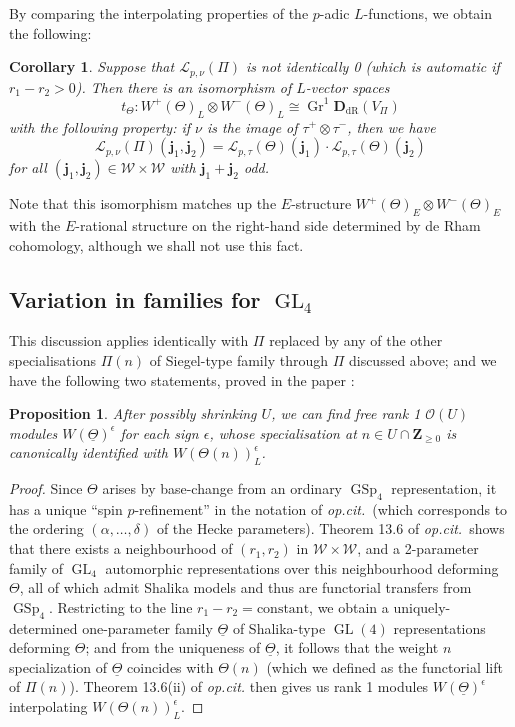 \documentclass[cjm]{ipart}
\theoremstyle{plain}
\newtheorem{proposition}[theorem]{Proposition}
\newtheorem{corollary}[theorem]{Corollary}
\theoremstyle{remark}
\DeclareMathOperator{\GL}{GL}
\DeclareMathOperator{\GSp}{GSp}
\newcommand{\DdR}{\mathbf{D}_{\mathrm{dR}}}
\newcommand{\ZZ}{\mathbf{Z}}
\newcommand{\bfj}{\mathbf{j}}
\newcommand{\cL}{\mathcal{L}}
\newcommand{\cO}{\mathcal{O}}
\newcommand{\cW}{\mathcal{W}}
\newcommand{\uTh}{\underline{\Theta}}
\numberwithin{equation}{subsection}
\renewcommand{\ge}{\geqslant}
\begin{document}
  By comparing the interpolating properties of the $p$-adic $L$-functions, we obtain the following:

  \begin{corollary}
   Suppose that $\cL_{p, \nu}(\Pi)$ is not identically 0 (which is automatic if $r_1 - r_2 > 0$). Then there is an isomorphism of $L$-vector spaces
   \[ t_{\Theta}: W^+(\Theta)_L \otimes W^-(\Theta)_L \cong \operatorname{Gr}^1 \DdR(V_{\Pi})\]
   with the following property: if $\nu$ is the image of $\tau^+ \otimes \tau^-$, then we have
   \[ \cL_{p, \nu}(\Pi)(\bfj_1, \bfj_2) = \cL_{p, \tau}(\Theta)(\bfj_1) \cdot \cL_{p, \tau}(\Theta)(\bfj_2)\]
   for all $(\bfj_1, \bfj_2) \in \cW \times \cW$ with $\bfj_1 + \bfj_2$ odd.
  \end{corollary}

  Note that this isomorphism matches up the $E$-structure $W^+(\Theta)_E \otimes W^-(\Theta)_E$ with the $E$-rational structure on the right-hand side determined by de Rham cohomology, although we shall not use this fact.

 \subsection{Variation in families for $\GL_4$}

  This discussion applies identically with $\Pi$ replaced by any of the other specialisations $\Pi(n)$ of Siegel-type family through $\Pi$ discussed above; and we have the following two statements, proved in the paper \cite{BDGJW25}:

  \begin{proposition}
   After possibly shrinking $U$, we can find free rank 1 $\cO(U)$ modules $W(\uTh)^{\epsilon}$ for each sign $\epsilon$, whose specialisation at $n \in U \cap \ZZ_{\ge 0}$ is canonically identified with $W(\Theta(n))_L^{\epsilon}$.
  \end{proposition}

  \begin{proof}
   Since $\Theta$ arises by base-change from an ordinary $\GSp_4$ representation, it has a unique ``spin $p$-refinement'' in the notation of \emph{op.cit.}~(which corresponds to the ordering $(\alpha, \dots, \delta)$ of the Hecke parameters). Theorem 13.6 of \emph{op.cit.}~shows that there exists a neighbourhood of $(r_1, r_2)$ in $\cW \times \cW$, and a 2-parameter family of $\GL_4$ automorphic representations over this neighbourhood deforming $\Theta$, all of which admit Shalika models and thus are functorial transfers from $\GSp_4$. Restricting to the line $r_1 - r_2 = \text{constant}$, we obtain a uniquely-determined one-parameter family $\underline{\Theta}$ of Shalika-type $\GL(4)$ representations deforming $\Theta$; and from the uniqueness of $\uTh$, it follows that the weight $n$ specialization of $\uTh$ coincides with $\Theta(n)$ (which we defined as the functorial lift of $\Pi(n)$). Theorem 13.6(ii) of \emph{op.cit.} then gives us rank 1 modules $W(\uTh)^{\epsilon}$ interpolating $W(\Theta(n))_L^{\epsilon}$. 
  \end{proof}
  
\end{document}
